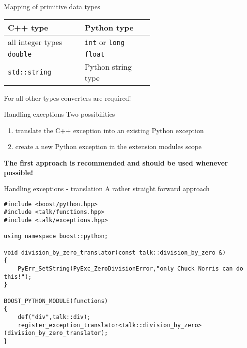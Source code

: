 \begin{frame}[fragile]{Mapping of primitive data types}
    \begin{center}
        {
            \renewcommand{\arraystretch}{1.5}
            \begin{tabular}{p{0.3\linewidth}|p{0.3\linewidth}}
            \textbf{C++ type} & \textbf{Python type} \\
            \hline
            all integer types & \texttt{int} or \texttt{long} \\
            \texttt{double} & \texttt{float} \\
            \texttt{std::string} & Python string type  \\
        \end{tabular}
    }
    \end{center}
    \vspace{0.1\textheight}
    For all other types converters are required!
\end{frame}

\begin{frame}[fragile]{Handling exceptions}
    Two possibilities
    \vspace{0.04\textheight}
    \begin{enumerate}
        \setlength{\itemsep}{0.04\textheight}
        \item translate the C++ exception into an existing Python exception
        \item create a new Python exception in the extension modules scope
    \end{enumerate}
    \vspace{0.1\textheight}
    \begin{center}
        \textbf{The first approach is recommended and should be used whenever
        possible!}
    \end{center}

\end{frame}

\begin{frame}[fragile]{Handling exceptions - translation}
    A rather straight forward approach
    \vspace{0.04\textheight}
    \begin{verbatim}
#include <boost/python.hpp>
#include <talk/functions.hpp>
#include <talk/exceptions.hpp>

using namespace boost::python;

void division_by_zero_translator(const talk::division_by_zero &)
{
    PyErr_SetString(PyExc_ZeroDivisionError,"only Chuck Norris can do this!");
}

BOOST_PYTHON_MODULE(functions)
{
    def("div",talk::div);
    register_exception_translator<talk::division_by_zero>(division_by_zero_translator);
}
    \end{verbatim}
\end{frame}

